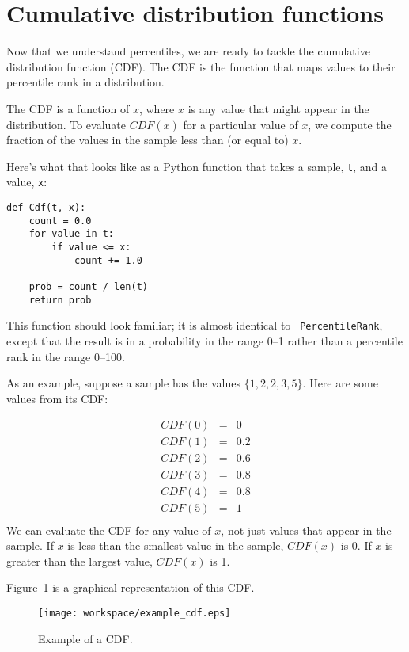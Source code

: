 \documentclass[10pt]{book}
\begin{document}
\section{Cumulative distribution functions}

Now that we understand percentiles, we are ready to tackle the
cumulative distribution function (CDF).  The CDF is the function that
maps values to their percentile rank in a distribution.

The CDF is a function of $x$, where $x$ is any value that might appear
in the distribution.  To evaluate $CDF(x)$ for a particular value of
$x$, we compute the fraction of the values in the sample less than (or
equal to) $x$.

Here's what that looks like as a Python function that takes a sample,
{\tt t}, and a value, {\tt x}:

\begin{verbatim}
def Cdf(t, x):
    count = 0.0
    for value in t:
        if value <= x:
            count += 1.0

    prob = count / len(t)
    return prob
\end{verbatim}

This function should look familiar; it is almost identical to {\tt
  PercentileRank}, except that the result is in a probability in the
range 0--1 rather than a percentile rank in the range 0--100.

As an example, suppose a sample has the values $\{1, 2, 2, 3, 5\}$.
Here are some values from its CDF:

\begin{eqnarray*}
CDF(0) &=& 0    \\
CDF(1) &=& 0.2    \\
CDF(2) &=& 0.6    \\
CDF(3) &=& 0.8    \\
CDF(4) &=& 0.8    \\
CDF(5) &=& 1    \\
\end{eqnarray*}
%
We can evaluate the CDF for any value of $x$, not just
values that appear in the sample.
If $x$ is less than the smallest value in the sample, $CDF(x)$ is 0.
If $x$ is greater than the largest value, $CDF(x)$ is 1.

Figure~\ref{example_cdf} is a graphical representation of this CDF.

\begin{figure}
\centerline{\texttt{[image: workspace/example\_cdf.eps]}}
\caption{Example of a CDF.}
\label{example_cdf}
\end{figure}
\end{document}
